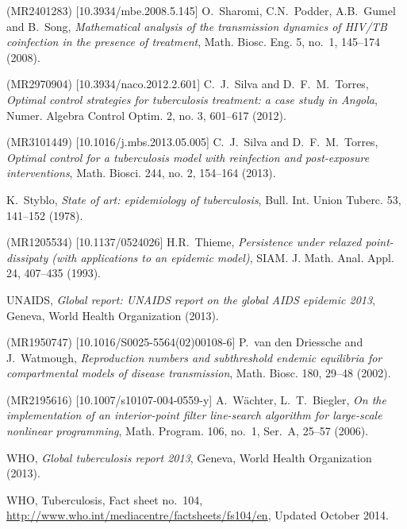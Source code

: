 \documentclass{my_aims}
\theoremstyle{definition}
\begin{document}
\begin{thebibliography}{99}
 (MR2401283) [10.3934/mbe.2008.5.145]
\newblock O.~Sharomi, C.N.~Podder, A.B.~Gumel and B.~Song,
\newblock \emph{Mathematical analysis of the transmission dynamics
of HIV/TB coinfection in the presence of treatment},
\newblock Math. Biosc. Eng. 5, no.~1, 145--174 (2008).

 (MR2970904) [10.3934/naco.2012.2.601]
\newblock C.~J.~Silva and D.~F.~M.~Torres,
\newblock \emph{Optimal control strategies for tuberculosis treatment: a case study in Angola},
\newblock Numer. Algebra Control Optim. 2, no. 3, 601--617 (2012).

 (MR3101449) [10.1016/j.mbs.2013.05.005]
\newblock C.~J.~Silva and D.~F.~M.~Torres,
\newblock \emph{Optimal control for a tuberculosis model
with reinfection and post-exposure interventions},
\newblock Math. Biosci. 244, no. 2, 154--164 (2013).

\newblock K.~Styblo,
\newblock \emph{State of art: epidemiology of tuberculosis},
\newblock Bull. Int. Union Tuberc. 53, 141--152 (1978).

 (MR1205534) [10.1137/0524026]
\newblock H.R.~Thieme,
\newblock \emph{Persistence under relaxed point-dissipaty
(with applications to an epidemic model)},
\newblock SIAM. J. Math. Anal. Appl. 24, 407--435 (1993).

\newblock UNAIDS,
\newblock \emph{Global report: UNAIDS report on the global AIDS epidemic 2013},
\newblock Geneva, World Health Organization (2013).

 (MR1950747) [10.1016/S0025-5564(02)00108-6]
\newblock P.~van den Driessche and J.~Watmough,
\newblock \emph{Reproduction numbers and subthreshold endemic equilibria
for compartmental models of disease transmission},
\newblock Math. Biosc. 180, 29--48 (2002).

 (MR2195616) [10.1007/s10107-004-0559-y]
\newblock A.~W\"achter, L.~T.~Biegler,
\newblock \emph{On the implementation of an interior-point filter
line-search algorithm for large-scale nonlinear programming},
\newblock Math. Program. 106, no.~1, Ser.~A, 25--57 (2006).

\newblock WHO,
\newblock \emph{Global tuberculosis report 2013},
\newblock Geneva, World Health Organization (2013).

\newblock WHO,
\newblock Tuberculosis,
\newblock Fact sheet no.~104,
\newblock \url{http://www.who.int/mediacentre/factsheets/fs104/en},
\newblock Updated October 2014.

\end{thebibliography}

\bigskip
\end{document}
